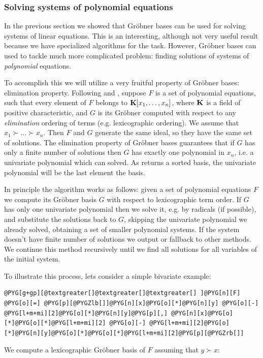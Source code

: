 \subsubsection{Solving systems of polynomial equations}

In the previous section we showed that Gröbner bases can be used for solving systems
of linear equations. This is an interesting, although not very useful result because we
have specialized algorithms for the task. However, Gröbner bases can used to tackle
much more complicated problem: finding solutions of systems of \emph{polynomial} equations.

To accomplish this we will utilize a very fruitful property of Gröbner bases: elimination
property. Following \cite{Buchberger2001systems} and \cite{Adams1994intro}, suppose $F$ is a set of
polynomial equations, such that every element of $F$ belongs to $\mathbf{K}[x_1, \ldots, x_n]$, where $\mathbf{K}$ is a field
of positive characteristic, and $G$ is its Gröbner computed with respect to any \emph{elimination}
ordering of terms (e.g. lexicographic ordering). We assume that $x_1 \succ \ldots \succ x_n$. Then
$F$ and $G$ generate the same ideal, so they have the same set of solutions. The elimination property
of Gröbner bases guarantees that if $G$ has only a finite number of solutions then $G$ has exactly
one polynomial in $x_n$, i.e. a univariate polynomial which can solved. As  returns
a sorted basis, the univariate polynomial will be the last element the basis.

In principle the algorithm works as follows: given a set of polynomial equations $F$ we compute
its Gröbner basis $G$ with respect to lexicographic term order. If $G$ has only one univariate
polynomial then we solve it, e.g. by radicals (if possible), and substitute the solutions back to
$G$, skipping the univariate polynomial we already solved, obtaining a set of smaller polynomial
systems. If the system doesn't have finite number of solutions we output  or fallback
to other methods. We continue this method recursively until we find all solutions for all variables
of the initial system.

To illustrate this process, lets consider a simple bivariate example:

\begin{Verbatim}[commandchars=@\[\]]
@PYG[g+gp][@textgreater[]@textgreater[]@textgreater[] ]@PYG[n][F] @PYG[o][=] @PYG[p][@PYGZlb[]]@PYG[n][x]@PYG[o][*]@PYG[n][y] @PYG[o][-] @PYG[l+m+mi][2]@PYG[o][*]@PYG[n][y]@PYG[p][,] @PYG[n][x]@PYG[o][*]@PYG[o][*]@PYG[l+m+mi][2] @PYG[o][-] @PYG[l+m+mi][2]@PYG[o][*]@PYG[n][y]@PYG[o][*]@PYG[o][*]@PYG[l+m+mi][2]@PYG[p][@PYGZrb[]]
\end{Verbatim}
\noindent
We compute a lexicographic Gröbner basis of $F$ assuming that $y \succ x$:

